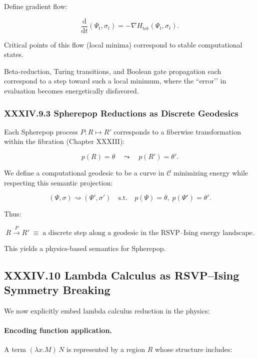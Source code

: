 \documentclass[12pt,letterpaper]{article}
\begin{document}
Define gradient flow:

\[
\frac{\mathrm{d}}{\mathrm{d}t}(\Psi_t,\sigma_t)
= 
- \nabla H_{\text{tot}}(\Psi_t, \sigma_t).
\]

Critical points of this flow (local minima) correspond to stable computational states.

Beta-reduction, Turing transitions, and Boolean gate propagation each correspond to a step toward such a local minimum, where the ``error’’ in evaluation becomes energetically disfavored.

\subsubsection{XXXIV.9.3 Spherepop Reductions as Discrete Geodesics}

Each Spherepop process $P : R \mapsto R'$ corresponds to a fiberwise transformation within the fibration (Chapter XXXIII):

\[
p(R) = \theta
\quad\leadsto\quad
p(R') = \theta'.
\]

We define a computational geodesic to be a curve in $\mathcal{C}$ minimizing energy while respecting this semantic projection:

\[
(\Psi,\sigma) \rightsquigarrow (\Psi',\sigma')
\quad\text{s.t.}\quad
p(\Psi) = \theta,\; p(\Psi') = \theta'.
\]

Thus:

\[
\boxed{
R \xrightarrow{P} R'
\;\equiv\;
\text{a discrete step along a geodesic in the RSVP--Ising energy landscape.}
}
\]

This yields a physics-based semantics for Spherepop.

\subsection{XXXIV.10 Lambda Calculus as RSVP–Ising Symmetry Breaking}

We now explicitly embed lambda calculus reduction in the physics:

\paragraph{Encoding function application.}
A term $(\lambda x.M)\,N$ is represented by a region $R$ whose structure includes:
\end{document}
